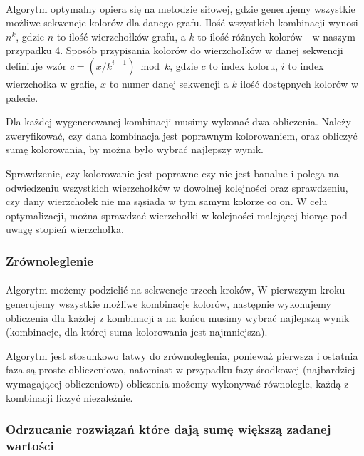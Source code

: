 \documentclass{article}
\begin{document}
\paragraph{} Algorytm optymalny opiera się na metodzie siłowej, gdzie generujemy wszystkie możliwe sekwencje kolorów dla danego grafu. Ilość wszystkich kombinacji wynosi $n^k$, gdzie $n$ to ilość wierzchołków grafu, a $k$ to ilość różnych kolorów - w naszym przypadku 4. Sposób przypisania kolorów do wierzchołków w danej sekwencji definiuje wzór $c = (x / k^{i-1}) \bmod k$, gdzie $c$ to index koloru, $i$ to index wierzchołka w grafie, $x$ to numer danej sekwencji a $k$ ilość dostępnych kolorów w palecie. 

Dla każdej wygenerowanej kombinacji musimy wykonać dwa obliczenia. Należy zweryfikować, czy dana kombinacja jest poprawnym kolorowaniem, oraz obliczyć sumę kolorowania, by można było wybrać najlepszy wynik.

Sprawdzenie, czy kolorowanie jest poprawne czy nie jest banalne i polega na odwiedzeniu wszystkich wierzchołków w dowolnej kolejności oraz sprawdzeniu, czy dany wierzchołek nie ma sąsiada w tym samym kolorze co on. W celu optymalizacji, można sprawdzać wierzchołki w kolejności malejącej biorąc pod uwagę stopień wierzchołka.

\subsubsection*{Zrównoleglenie}

\paragraph{} Algorytm możemy podzielić na sekwencje trzech kroków, W pierwszym kroku generujemy wszystkie możliwe kombinacje kolorów, następnie wykonujemy obliczenia dla każdej z kombinacji a na końcu musimy wybrać najlepszą wynik (kombinacje, dla której suma kolorowania jest najmniejsza).

Algorytm jest stosunkowo łatwy do zrównoleglenia, ponieważ pierwsza i ostatnia faza są proste obliczeniowo, natomiast w przypadku fazy środkowej (najbardziej wymagającej obliczeniowo) obliczenia możemy wykonywać równolegle, każdą z kombinacji liczyć niezależnie.

\subsubsection*{Odrzucanie rozwiązań które dają sumę większą zadanej wartości}
\end{document}
